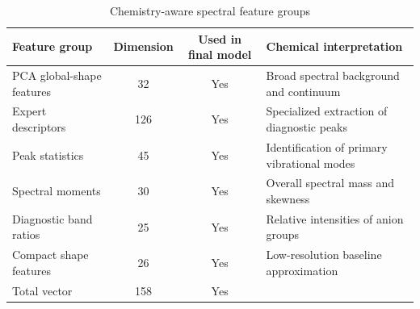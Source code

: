 \begin{table}[htbp]
\caption{Chemistry-aware spectral feature groups}
\label{tab:feature_groups}
\centering
\begin{tabular}{lccl}
\toprule
\textbf{Feature group} & \textbf{Dimension} & \textbf{Used in final model} & \textbf{Chemical interpretation} \\
\midrule
PCA global-shape features & 32 & Yes & Broad spectral background and continuum \\
Expert descriptors & 126 & Yes & Specialized extraction of diagnostic peaks \\
\hspace{3mm} Peak statistics & 45 & Yes & Identification of primary vibrational modes \\
\hspace{3mm} Spectral moments & 30 & Yes & Overall spectral mass and skewness \\
\hspace{3mm} Diagnostic band ratios & 25 & Yes & Relative intensities of anion groups \\
\hspace{3mm} Compact shape features & 26 & Yes & Low-resolution baseline approximation \\
\midrule
Total vector & 158 & Yes & \\
\bottomrule
\end{tabular}
\end{table}
